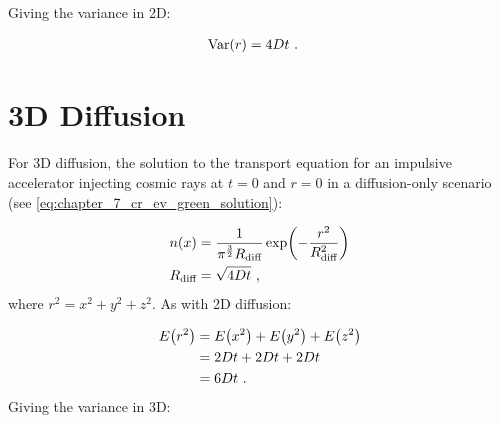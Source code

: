 \noindent Giving the variance in 2D:

\begin{equation}
    \begin{aligned}
        \mathrm{Var}\qty(r)&=4Dt\text{ .} 
    \end{aligned}
\end{equation}

\section{3D Diffusion}

For 3D diffusion, the solution to the transport equation for an impulsive accelerator injecting cosmic rays at $t=0$ and $r=0$ in a diffusion-only scenario (see \autoref{eq:chapter_7_cr_ev_green_solution}):

\begin{equation}
    \begin{aligned}
        n\qty(x)&=\frac{1}{\pi^{\frac{3}{2}} R_\text{diff}}\exp(-\frac{r^2}{R_\text{diff}^2}) \\
        R_\text{diff}&=\sqrt{4Dt}\text{ ,} 
    \end{aligned}
\end{equation}
\noindent where $r^2=x^2+y^2+z^2$. As with 2D diffusion:

\begin{equation}
    \begin{aligned}
        E\qty(r^2)&=E\qty(x^2)+E\qty(y^2)+E\qty(z^2) \\
        &= 2Dt + 2Dt + 2Dt \\
        &=6Dt\text{ .} 
    \end{aligned}
\end{equation}
\noindent Giving the variance in 3D:

